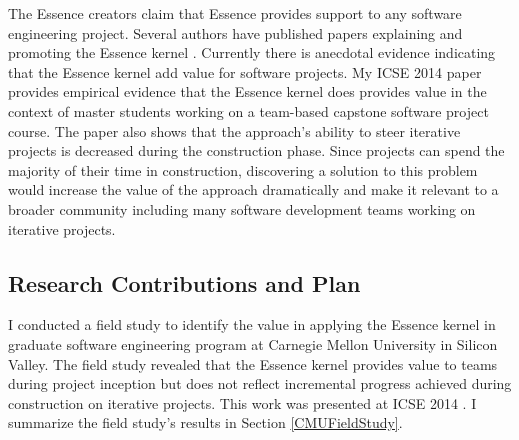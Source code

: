 \documentclass[preprint,12pt,3p]{elsarticle}
\begin{document}
The Essence creators claim that Essence provides support to any software engineering project. Several authors have published papers explaining and promoting the Essence kernel \cite{CallToAction, JacobsonQueue, OMGStandard,  AgileSEMAT, EssenceBook, JacobsonMajorLeaugue, JacobsonNewSoftwareEngineering}. Currently there is anecdotal evidence indicating that the Essence kernel add value for software projects. My ICSE 2014 paper provides empirical evidence that the Essence kernel does provides value in the context of master students working on a team-based capstone software project course. 
The paper also shows that the approach's ability to steer iterative projects is decreased during the construction phase. Since projects can spend the majority of their time in construction, discovering a solution to this problem would increase the value of the approach dramatically and make it relevant to a broader community including many software development teams working on iterative projects.

\subsection{Research Contributions and Plan}

I conducted a field study to identify the value in applying the Essence kernel in graduate software engineering program at Carnegie Mellon University in Silicon Valley. The field study revealed that the Essence kernel provides value to teams during project inception but does not reflect incremental progress achieved during construction on iterative projects. This work was presented at ICSE 2014 \cite{ICSE2014}. I summarize the field study's results in Section \ref{CMUFieldStudy}.
\end{document}

